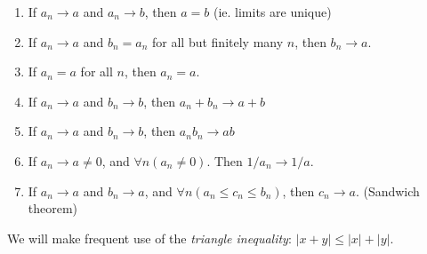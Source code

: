 \documentclass[a4paper]{article}
\begin{document}
  \begin{thm}\leavevmode
    \begin{enumerate}
      \item If $a_n\to a$ and $a_n\to b$, then $a = b$ (ie. limits are unique)
      \item If $a_n \to a$ and $b_n = a_n$ for all but finitely many $n$, then $b_n \to a$.
      \item If $a_n = a$ for all $n$, then $a_n = a$.
      \item If $a_n\to a$ and $b_n\to b$, then $a_n + b_n \to a+ b$
      \item If $a_n\to a$ and $b_n \to b$, then $a_nb_n\to ab$
      \item If $a_n\to a\not= 0$, and $\forall n(a_n \not= 0)$. Then $1/a_n \to 1/a$.
      \item If $a_n \to a$ and $b_n \to a$, and $\forall n(a_n\leq c_n\leq b_n)$, then $c_n \to a$. (Sandwich theorem)
    \end{enumerate}
  \end{thm}
  \note We will make frequent use of the \emph{triangle inequality}: $|x + y|\leq |x| + |y|$.
\end{document}
